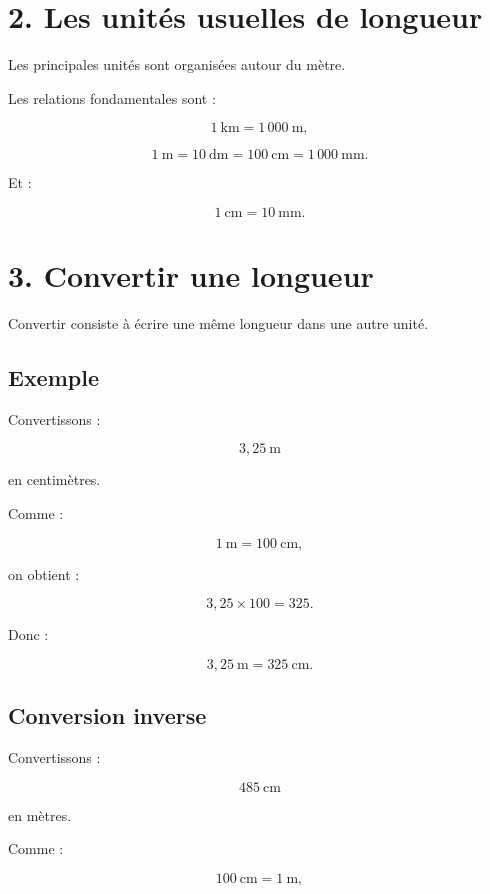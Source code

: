 \section{2. Les unités usuelles de longueur}

Les principales unités sont organisées autour du mètre.


Les relations fondamentales sont :

\[
1\ \text{km}=1\,000\ \text{m},
\]

\[
1\ \text{m}=10\ \text{dm}=100\ \text{cm}=1\,000\ \text{mm}.
\]

Et :

\[
1\ \text{cm}=10\ \text{mm}.
\]

\section{3. Convertir une longueur}

Convertir consiste à écrire une même longueur dans une autre unité.

\subsection{Exemple}

Convertissons :

\[
3{,}25\ \text{m}
\]

en centimètres.

Comme :

\[
1\ \text{m}=100\ \text{cm},
\]

on obtient :

\[
3{,}25\times100=325.
\]

Donc :

\[
\boxed{3{,}25\ \text{m}=325\ \text{cm}}.
\]

\subsection{Conversion inverse}

Convertissons :

\[
485\ \text{cm}
\]

en mètres.

Comme :

\[
100\ \text{cm}=1\ \text{m},
\]

